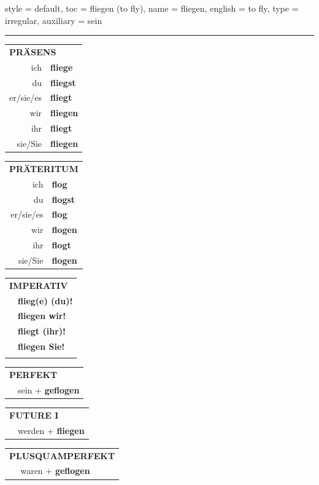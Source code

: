 \begin{verbentry}{
  style = {default},
  toc = {fliegen (to fly)},
  name = {fliegen},
  english = {to fly},
  type = {irregular},
  auxiliary = {sein}
}
 
    
     \vspace{5pt}

    \hrule
    
    \vspace{5pt}

  \begin{tabular}{rl}
     \multicolumn{2}{l}{\textbf{PRÄSENS} }\\
    ich & \textbf{fliege}\\
    du & \textbf{fliegst}\\
    er/sie/es & \textbf{fliegt}\\
    wir & \textbf{fliegen}\\
    ihr & \textbf{fliegt}\\
    sie/Sie & \textbf{fliegen}\\
  \end{tabular}
  \hfill
     \begin{tabular}{rl}
    \multicolumn{2}{l}{\textbf{PRÄTERITUM} }\\
    ich & \textbf{flog}\\
    du & \textbf{flogst}\\
    er/sie/es & \textbf{flog}\\
    wir & \textbf{flogen}\\
    ihr & \textbf{flogt}\\
    sie/Sie & \textbf{flogen}\\
  \end{tabular}
  \hfill
  \begin{tabular}{rl}
     \multicolumn{2}{l}{\textbf{IMPERATIV} }\\
   & \textbf{flieg(e) (du)!}\\
   & \textbf{fliegen wir!}\\
   & \textbf{fliegt (ihr)!}\\
   & \textbf{fliegen Sie!}\\
   & \vspace{10pt}
  \end{tabular}

    \vspace{10pt}

 \begin{tabular}{rl}
     \multicolumn{2}{l}{\textbf{PERFEKT}}\\
   & sein + \textbf{geflogen}\\
  \end{tabular}
\hfill
   \begin{tabular}{rl}
    \multicolumn{2}{l}{\textbf{FUTURE I} }\\
   & werden + \textbf{fliegen}\\
  \end{tabular}
\hfill
   \begin{tabular}{rl}
      \multicolumn{2}{l}{\textbf{PLUSQUAMPERFEKT}}\\
   & waren + \textbf{geflogen}\\
  \end{tabular}


\end{verbentry}
